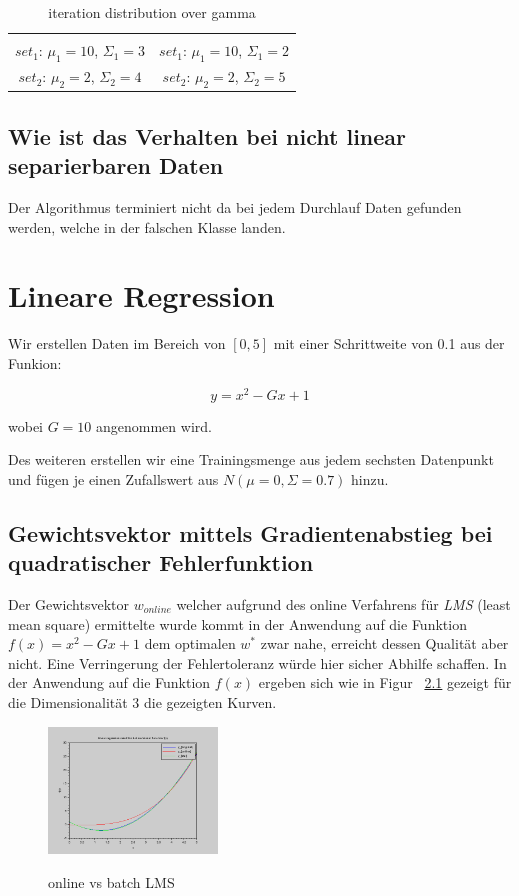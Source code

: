\documentclass[]{report}
\begin{document}
\begin{table}[h]
\begin{tabular}{| c | c |}
 & \\
$set_1$: $\mu_1=10$, $\Sigma_1=3$ & $set_1$: $\mu_1=10$, $\Sigma_1=2$ \\
$set_2$: $\mu_2=2$, $\Sigma_2=4$ & $set_2$: $\mu_2=2$, $\Sigma_2=5$ \\
\hline
\end{tabular}
\caption{iteration distribution over gamma}
\label{tab:DataSetsAndBounds}
\end{table}

\section{Wie ist das Verhalten bei nicht linear separierbaren Daten}

Der Algorithmus terminiert nicht da bei jedem Durchlauf Daten gefunden werden, welche in der falschen Klasse landen.

\chapter{Lineare Regression}

Wir erstellen Daten im Bereich von $[0,5]$ mit einer Schrittweite von 0.1 aus der Funkion:

\begin{equation}
y=x^2-Gx+1
\end{equation}

wobei $G=10$ angenommen wird.

Des weiteren erstellen wir eine Trainingsmenge aus jedem sechsten Datenpunkt und f\"ugen je einen Zufallswert aus $N(\mu=0,\Sigma=0.7)$ hinzu.

\section{Gewichtsvektor mittels Gradientenabstieg bei quadratischer Fehlerfunktion}

Der Gewichtsvektor $w_{online}$ welcher aufgrund des online Verfahrens f\"ur \emph{LMS} (least mean square) ermittelte wurde kommt in der Anwendung auf die Funktion $f(x)=x^2-Gx+1$ dem optimalen $w^*$ zwar nahe, erreicht dessen Qualit\"at aber nicht. Eine Verringerung der Fehlertoleranz w\"urde hier sicher Abhilfe schaffen.
In der Anwendung auf die Funktion $f(x)$ ergeben sich wie in Figur ~\ref{fig:onlineVsBatchLMS} gezeigt f\"ur die Dimensionalit\"at $3$ die gezeigten Kurven.
  
\begin{figure}[h]
\centering
\includegraphics[width=0.4\textwidth]{./images/OnlineVsBatchLMS.png} \\
\caption{online vs batch LMS}
\label{fig:onlineVsBatchLMS}
\end{figure}  
\end{document}
